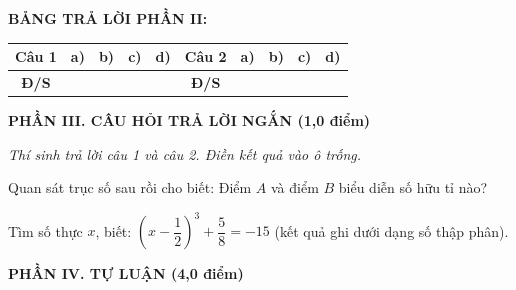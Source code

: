 \documentclass[12pt,a4paper]{article}
\begin{document}
\noindent\textbf{BẢNG TRẢ LỜI PHẦN II:}
\begin{center}
\begin{tabular}{|c|c|c|c|c||c|c|c|c|c|}
\hline
\textbf{Câu 1} & \textbf{a)} & \textbf{b)} & \textbf{c)} & \textbf{d)} & \textbf{Câu 2} & \textbf{a)} & \textbf{b)} & \textbf{c)} & \textbf{d)} \\
\hline
\textbf{Đ/S} & \rule{0pt}{0.6cm} & & & & \textbf{Đ/S} & & & & \\
\hline
\end{tabular}
\end{center}
\vspace{2mm}

\setcounter{ex}{0}
\noindent\textbf{\large PHẦN III. CÂU HỎI TRẢ LỜI NGẮN (1,0 điểm)}

\textit{Thí sinh trả lời câu 1 và câu 2. Điền kết quả vào ô trống.}

\vspace{1mm}
\begin{ex}
Quan sát trục số sau rồi cho biết: Điểm $A$ và điểm $B$ biểu diễn số hữu tỉ nào?
\begin{center}
\end{center}
\hfill{}
\end{ex}

\begin{ex}
Tìm số thực $x$, biết: $\left(x-\dfrac{1}{2}\right)^3 + \dfrac{5}{8} = -15$ (kết quả ghi dưới dạng số thập phân). 
\end{ex}


\setcounter{ex}{0}
\noindent\textbf{\large PHẦN IV. TỰ LUẬN (4,0 điểm)}
\end{document}
